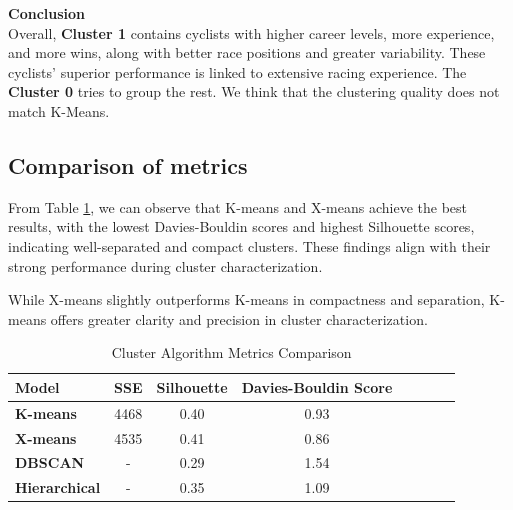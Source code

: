 \noindent\textbf{Conclusion}\\
Overall, \textbf{Cluster 1} contains cyclists with higher career levels, more experience, and more wins, along with better race positions and greater variability. These cyclists' superior performance is linked to extensive racing experience. The \textbf{Cluster 0} tries to group the rest. We think that the clustering quality does not match K-Means.

\subsection{Comparison of metrics}
From Table \ref{tab:clustering_results}, we can observe that K-means and X-means achieve the best results, with the lowest Davies-Bouldin scores and highest Silhouette scores, indicating well-separated and compact clusters. These findings align with their strong performance during cluster characterization.

While X-means slightly outperforms K-means in compactness and separation, K-means offers greater clarity and precision in cluster characterization.

\begin{table}[H]
    \centering
    \scriptsize
    \begin{tabular}{p{2.0cm}ccccccc}
    \toprule
    \textbf{Model} & \textbf{SSE} & \textbf{Silhouette} & \textbf{Davies-Bouldin Score} \\
    \midrule
    \textbf{K-means} 
      & 4468
      & 0.40
      & 0.93 \\
    \textbf{X-means} 
      & 4535
      & 0.41
      & 0.86 \\
    \textbf{DBSCAN} 
      & -
      & 0.29
      & 1.54\\
    \textbf{Hierarchical} 
      & -
      & 0.35
      & 1.09 \\
    \bottomrule
    \end{tabular}
    \caption{ \small \small Cluster Algorithm Metrics Comparison}
    \label{tab:clustering_results}
\end{table}